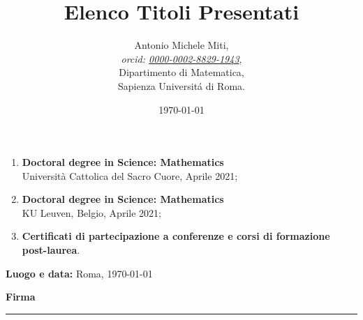 \documentclass[a4paper]{article}
\title{Elenco Titoli Presentati}
\date{\today}
\author{
	Antonio Michele Miti,\\
	\emph{orcid: \href{https://orcid.org/0000-0002-8829-1943}{0000-0002-8829-1943}},
	\\
	Dipartimento di Matematica,\\
	Sapienza Universit\'a di Roma.
}
\begin{document}
	\maketitle

\begin{enumerate}[leftmargin=*, label=\arabic*.]
    \item \textbf{Doctoral degree in Science: Mathematics} \\
    Università Cattolica del Sacro Cuore, Aprile 2021;

    \item \textbf{Doctoral degree in Science: Mathematics} \\
     KU Leuven, Belgio, Aprile 2021;

    \item \textbf{Certificati di partecipazione a conferenze e corsi di formazione post-laurea}.
\end{enumerate}


\vfill

\noindent\begin{minipage}[t]{0.5\textwidth}
\textbf{Luogo e data:} Roma, \today
\end{minipage}%
\hfill
\begin{minipage}[t]{0.4\textwidth}
\begin{flushright}
\textbf{Firma}\\[2em] %
\rule{5cm}{0.4pt}
\end{flushright}
\end{minipage}

  
\end{document}
